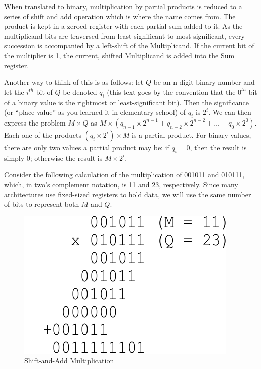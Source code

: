 \documentclass{article}
\begin{document}

When translated to binary, multiplication by partial products is reduced to a series of shift and add operation which is where the name comes from.
The product is kept in a zeroed register with each partial sum added to it.
As the multiplicand bits are traversed from least-significant to most-significant, every succession is accompanied by a left-shift of the Multiplicand.
If the current bit of the multiplier is 1, the current, shifted Multiplicand is added into the Sum register.

Another way to think of this is as follows: let $Q$ be an n-digit binary number and let the $i^{th}$ bit of $Q$ be denoted $q_i$ (this text goes by the convention that the $0^{th}$ bit of a binary value is the rightmost or least-significant bit).
Then the significance (or ``place-value'' as you learned it in elementary school) of $q_i$ is $2^i$.
We can then express the problem $M \times Q$ as $M \times (q_{n-1} \times 2^{n-1} + q_{n-2} \times 2^{n-2} + \ldots + q_{0} \times 2^{0})$.
Each one of the products $(q_i \times 2^{i}) \times M$ is a partial product.
For binary values, there are only two values a partial product may be: if $q_i = 0$, then the result is simply $0$; otherwise the result is $M \times 2^i$.

Consider the following calculation of the multiplication of 001011 and 010111, which, in two's complement notation, is 11 and 23, respectively.
Since many architectures use fixed-sized registers to hold data, we will use the same number of bits to represent both $M$ and $Q$.
\pagebreak
\begin{figure}
\centering
\includegraphics[scale=0.7]{saam3.pdf}
\caption{Shift-and-Add Multiplication}
\end{figure}
\end{document}
